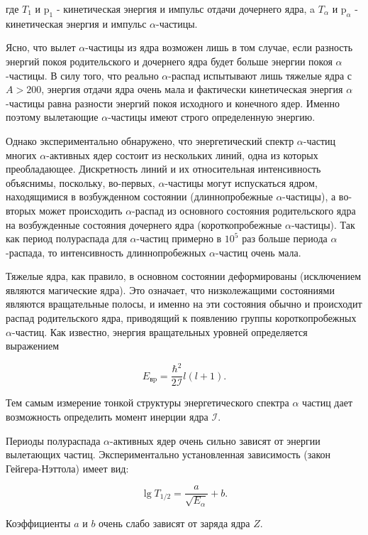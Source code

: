 \documentclass[a4paper, 12pt]{article}
\begin{document}
где $T_1$ и $\mathrm{p}_1$ - кинетическая энергия и импульс отдачи дочернего ядра, a $T_\alpha$ и $\mathrm{p}_\alpha$ - кинетическая энергия и импульс $\alpha$-частицы.

Ясно, что вылет $\alpha$-частицы из ядра возможен лишь в том случае, если разность энергий покоя родительского и дочернего ядра будет больше энергии покоя $\alpha$-частицы. В силу того, что реально $\alpha$-распад испытывают лишь тяжелые ядра с $A>200$, энергия отдачи ядра очень мала и фактически кинетическая энергия $\alpha$-частицы равна разности энергий покоя исходного и конечного ядер. Именно поэтому вылетающие $\alpha$-частицы имеют строго определенную энергию.

Однако экспериментально обнаружено, что энергетический спектр $\alpha$-частиц многих $\alpha$-активных ядер состоит из нескольких линий, одна из которых преобладающее. Дискретность линий и их относительная интенсивность объяснимы, поскольку, во-первых, $\alpha$-частицы могут испускаться ядром, находящимися в возбужденном состоянии (длиннопробежные $\alpha$-частицы), а во-вторых может происходить $\alpha$-распад из основного состояния родительского ядра на возбужденные состояния дочернего ядра (короткопробежные $\alpha$-частицы). Так как период полураспада для $\alpha$-частиц примерно в $10^5$ раз больше периода $\alpha$-распада, то интенсивность длиннопробежных $\alpha$-частиц очень мала.

Тяжелые ядра, как правило, в основном состоянии деформированы (исключением являются магические ядра). Это означает, что низколежащими состояниями являются вращательные полосы, и именно на эти состояния обычно и происходит распад родительского ядра, приводящий к появлению группы короткопробежных $\alpha$-частиц. Как известно, энергия вращательных уровней определяется выражением

$$
E_\text{вp}=\frac{\hbar^2}{2 \mathcal{I}} l(l+1).
$$

Тем самым измерение тонкой структуры энергетического спектра $\alpha$ частиц дает возможность определить момент инерции ядра $\mathcal{I}$.

Периоды полураспада $\alpha$-активных ядер очень сильно зависят от энергии вылетающих частиц. Экспериментально установленная зависимость (закон Гейгера-Нэттола) имеет вид:

\begin{equation}\label{eq:gey_net}
\lg T_{1 / 2}=\frac{a}{\sqrt{E_\alpha}}+b .
\end{equation}

Коэффициенты $a$ и $b$ очень слабо зависят от заряда ядра $Z$.
\end{document}
